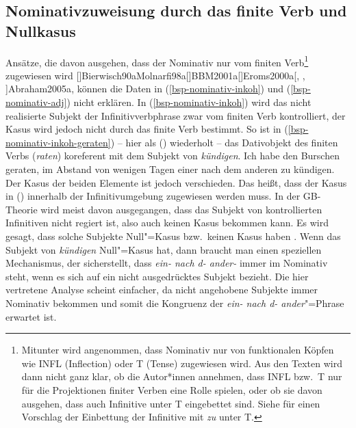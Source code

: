 \subsection{Nominativzuweisung durch das finite Verb und Nullkasus}
\label{sec-kasus-fin-verb-nullkasus}

Ansätze, die davon ausgehen, dass der Nominativ nur vom finiten Verb\footnote{
  Mitunter wird angenommen, dass Nominativ nur von funktionalen Köpfen wie INFL (Inflection) oder T (Tense) zugewiesen
  wird. Aus den Texten wird dann nicht ganz klar, ob die Autor*innen annehmen, dass INFL bzw.\ T nur für
  die Projektionen finiter Verben eine Rolle spielen, oder ob sie davon ausgehen, dass auch
  Infinitive unter T eingebettet sind. Siehe \citet[]{Wurmbrand2003a} für einen Vorschlag der Einbettung
  der Infinitive mit \emph{zu} unter T.%
} zugewiesen wird
%
\parencites[]{Chomsky93a}[]{Haider84b}[]{FF87a}%
[]{Bierwisch90a}{Molnarfi98a}[]{BBM2001a}[]{Eroms2000a}[, , ]{Abraham2005a}, 
können die Daten in (\ref{bsp-nominativ-inkoh}) und (\ref{bsp-nominativ-adj}) nicht erklären.
In (\ref{bsp-nominativ-inkoh}) wird das nicht realisierte Subjekt der Infinitivverbphrase
zwar vom finiten Verb kontrolliert, der Kasus wird jedoch nicht durch das finite Verb
bestimmt. So ist \zb in (\ref{bsp-nominativ-inkoh-geraten}) -- hier als () wiederholt -- das Dativobjekt 
des finiten Verbs (\emph{raten}) koreferent mit dem Subjekt von \emph{kündigen}. 
\ea
Ich habe den Burschen geraten, im Abstand von wenigen Tagen einer nach dem anderen zu kündigen.
\z
Der Kasus der beiden Elemente ist jedoch verschieden. Das heißt, dass der Kasus in ()
innerhalb der Infinitivumgebung zugewiesen werden muss. In der GB-Theorie wird meist davon
ausgegangen, dass das Subjekt von kontrollierten Infinitiven nicht regiert ist, also auch
keinen Kasus bekommen kann. Es wird gesagt, dass solche Subjekte Null"=Kasus bzw.\ keinen Kasus
haben \parencites[]{Grewendorf88a}[]{Frey93a}.
Wenn das Subjekt von \emph{kündigen} Null"=Kasus hat,
dann braucht man einen speziellen Mechanismus, der sicherstellt,
dass \emph{ein- nach d- ander-} immer im Nominativ steht, wenn es sich auf ein nicht 
ausgedrücktes Subjekt bezieht. Die hier vertretene Analyse scheint einfacher,
da nicht angehobene Subjekte immer Nominativ bekommen und somit
die Kongruenz der \emph{ein- nach d- ander}"=Phrase erwartet ist.




